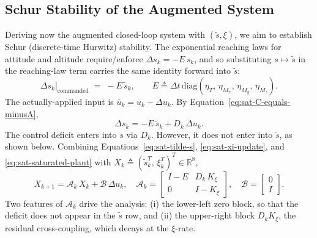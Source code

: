 \documentclass[conf]{new-aiaa}
\begin{document}
\subsection{Schur Stability of the Augmented System}
\label{sec:sat-schur}

Deriving now the augmented closed-loop system with $(\tilde s, \xi)$, we aim to establish Schur (discrete-time Hurwitz) stability. The exponential reaching laws for attitude and altitude require/enforce $\Delta s_k = -E\, s_k$, and so substituting $s \mapsto \tilde s$ in the reaching-law term carries the same identity forward into $\tilde s$:
\begin{equation}
\label{eq:sat-commanded-Ds}
\Delta s_k \big|_{\mathrm{commanded}}
\;=\; -E\, \tilde s_k,
\qquad
E \triangleq \Delta t\, \mathrm{diag}(\eta_T,\, \eta_{M_x},\, \eta_{M_y},\, \eta_{M_z}).
\end{equation}
The actually-applied input is $\bar u_k = u_k - \Delta u_k$. By Equation~\ref{eq:sat-C-equals-minusA},
\begin{equation}
\label{eq:sat-saturated-plant}
\Delta s_k = -E\, \tilde s_k + D_k\, \Delta u_k.
\end{equation}
The control deficit enters into $s$ via $D_k$. However, it does not enter into $\tilde s$, as shown below. Combining Equations~\ref{eq:sat-tilde-s}, \ref{eq:sat-xi-update}, and \ref{eq:sat-saturated-plant} with $X_k \triangleq (\tilde s_k^T,\, \xi_k^T)^T \in \mathbb{R}^8$,
\small
\begin{equation}
\label{eq:sat-closed-loop}
X_{k+1} = \mathcal{A}_k\, X_k + \mathcal{B}\, \Delta u_k,
\quad
\mathcal{A}_k = \begin{bmatrix}
I - E & D_k\, K_\xi \\
0 & I - K_\xi
\end{bmatrix},
\quad
\mathcal{B} = \begin{bmatrix} 0 \\ I \end{bmatrix}.
\end{equation}
\normalsize
Two features of $\mathcal{A}_k$ drive the analysis: (i) the lower-left zero block, so that the deficit does not appear in the $\tilde s$ row, and (ii) the upper-right block $D_k K_\xi$, the residual cross-coupling, which decays at the $\xi$-rate.
\end{document}
